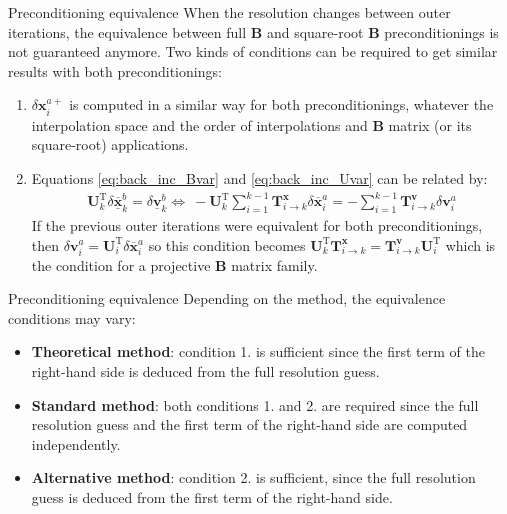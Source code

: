 \documentclass[10pt]{beamer}
\begin{document}
\begin{frame}{Preconditioning equivalence}
When the resolution changes between outer iterations, the equivalence between full $\mathbf{B}$ and square-root $\mathbf{B}$ preconditionings is not guaranteed anymore. Two kinds of conditions can be required to get similar results with both preconditionings:
\begin{enumerate}
\item $\delta \mathbf{x}^{a+}_i$ is computed in a similar way for both preconditionings, whatever the interpolation space and the order of interpolations and $\mathbf{B}$ matrix (or its square-root) applications.
\item Equations \eqref{eq:back_inc_Bvar} and \eqref{eq:back_inc_Uvar} can be related by:
\begin{align}\mathbf{U}^\mathrm{T}_k \delta \underline{\overline{\mathbf{x}}}^b_k = \delta \underline{\mathbf{v}}^b_k \Leftrightarrow \ - \mathbf{U}^\mathrm{T}_k  \sum_{i=1}^{k-1} \mathbf{T}^\mathbf{x}_{i \rightarrow k} \delta \overline{\mathbf{x}}^a_i = - \sum_{i=1}^{k-1} \mathbf{T}^\mathbf{v}_{i \rightarrow k} \delta \mathbf{v}^a_i
\end{align}
If the previous outer iterations were equivalent for both preconditionings, then $\delta \mathbf{v}^a_i = \mathbf{U}^\mathrm{T}_i \delta \overline{\mathbf{x}}^a_i$ so this condition becomes $\mathbf{U}^\mathrm{T}_k \mathbf{T}^\mathbf{x}_{i \rightarrow k} = \mathbf{T}^\mathbf{v}_{i \rightarrow k} \mathbf{U}^\mathrm{T}_i$ which is the condition for a projective $\mathbf{B}$ matrix family.
\end{enumerate}
\end{frame}

\begin{frame}{Preconditioning equivalence}
 Depending on the method, the equivalence conditions may vary:
\begin{itemize}
\item \textbf{Theoretical method}: condition 1. is sufficient since the first term of the right-hand side is deduced from the full resolution guess.
\item \textbf{Standard method}: both conditions 1. and 2. are required since the full resolution guess and the first term of the right-hand side are computed independently.
\item \textbf{Alternative method}: condition 2. is sufficient, since the full resolution guess is deduced from the first term of the right-hand side.
\end{itemize}
\end{frame}
\end{document}
